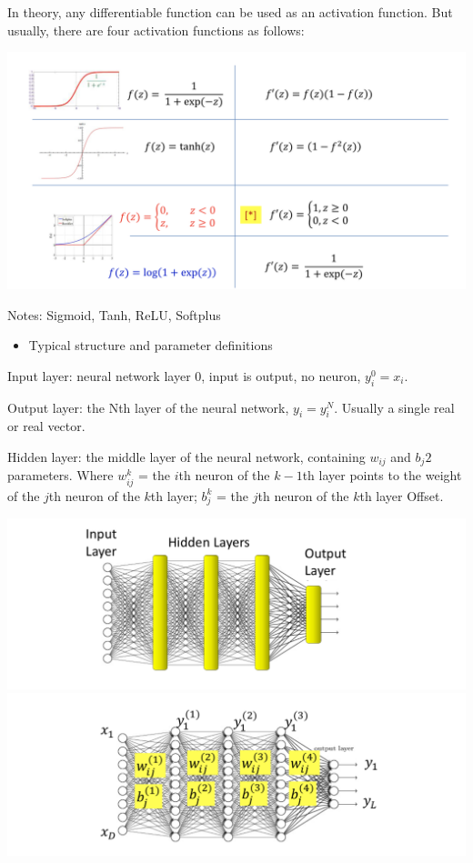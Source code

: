 \documentclass{article}
\begin{document}
	In theory, any differentiable function can be used as an activation function. But usually, there are four activation functions as follows:
	
	\includegraphics[scale=0.2]{59.png}
	
	Notes: Sigmoid, Tanh, ReLU, Softplus
	
	
	\begin{itemize}
		\item Typical structure and parameter definitions
	\end{itemize}
	
	
	Input layer: neural network layer 0, input is output, no neuron, $y_i^{0} = x_i$.
	
	Output layer: the Nth layer of the neural network, $y_i=y_i^{N}$. Usually a single real or real vector.
	
	Hidden layer: the middle layer of the neural network, containing $w_{ij}$ and $b_j2$ parameters. Where $w_{ij}^{k}$ = the $i$th neuron of the $k-1$th layer points to the weight of the $j$th neuron of the $k$th layer; $b_j^{k}$ = the $j$th neuron of the $k$th layer Offset.
	
	\includegraphics[scale=0.2]{60.png}
	\includegraphics[scale=0.2]{61.png} \\ \\ \\ \\
	
\end{document}
